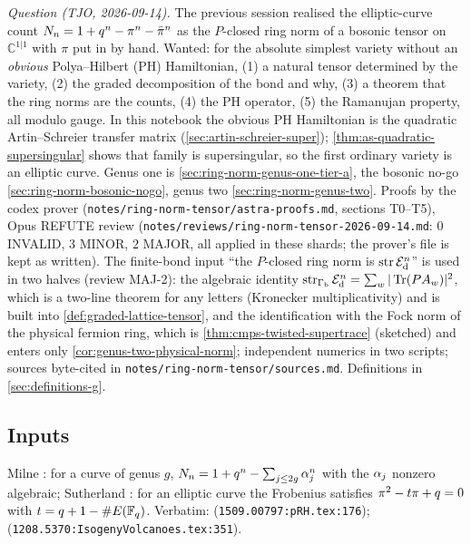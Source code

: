 \emph{Question (TJO, 2026-09-14).} The previous session realised the elliptic-curve count
$N_{n} = 1+q^n-\pi^n-\bar\pi^n$ as the $P$-closed ring norm of a bosonic
tensor on $\mathbb C^{1|1}$ with $\pi$ put in by hand. Wanted: for the absolute simplest
variety without an \emph{obvious} Polya--Hilbert (PH) Hamiltonian, (1) a natural tensor
determined by the variety, (2) the graded decomposition of the bond and why, (3) a theorem
that the ring norms are the counts, (4) the PH operator, (5) the Ramanujan property, all modulo
gauge. In this notebook the obvious PH Hamiltonian is the quadratic Artin--Schreier transfer
matrix (\cref{sec:artin-schreier-super}); \cref{thm:as-quadratic-supersingular} shows that
family is supersingular, so the first ordinary variety is an elliptic curve. Genus one is
\cref{sec:ring-norm-genus-one-tier-a}, the bosonic no-go \cref{sec:ring-norm-bosonic-nogo}, genus two
\cref{sec:ring-norm-genus-two}. Proofs by the codex prover
(\texttt{notes/ring-norm-tensor/astra-proofs.md}, sections T0--T5), Opus REFUTE review
(\texttt{notes/reviews/ring-norm-tensor-2026-09-14.md}: $0$ INVALID, $3$ MINOR, $2$ MAJOR, all applied
in these shards; the prover's file is kept as written). The finite-bond input ``the $P$-closed ring
norm is $\operatorname{str}\mathcal E_{\mathrm d}^n$'' is used in two halves (review MAJ-2): the algebraic identity
$\operatorname{str}_{\Gamma_{\mathrm b}}\mathcal E_{\mathrm d}^n = \sum_w|\operatorname{Tr}(PA_w)|^2$, which is a two-line theorem for any letters (Kronecker multiplicativity) and is
built into \cref{def:graded-lattice-tensor}, and the identification with the Fock norm of the
physical fermion ring, which is \cref{thm:cmps-twisted-supertrace} (sketched) and enters only
\cref{cor:genus-two-physical-norm}; independent numerics in two scripts; sources byte-cited in
\texttt{notes/ring-norm-tensor/sources.md}. Definitions in \cref{sec:definitions-g}.

\subsection{Inputs}

\begin{citedfact}
\label{cit:frob-count-formula}
Milne \cite{milne2015rh}: for a curve of genus $g$, $N_{n} = 1+q^n-\sum_{j\le2g}\alpha_{j}^n$
with the $\alpha_{j}$ nonzero algebraic; Sutherland \cite{sutherland2012volcanoes}: for an
elliptic curve the Frobenius satisfies $\pi^2-t\pi+q = 0$ with $t = q+1-\#E(\mathbb F_q)$.
Verbatim: \texttt{} (\texttt{1509.00797:pRH.tex:176});
\texttt{}
(\texttt{1208.5370:IsogenyVolcanoes.tex:351}).
\end{citedfact}

